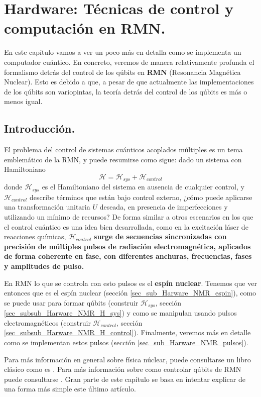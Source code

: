 \documentclass[a4paper,11pt]{book} %
\numberwithin{equation}{chapter}
\begin{document}
\chapter{Hardware: Técnicas de control y computación en RMN.}

En este capítulo vamos a ver un poco más en detalla como se implementa un computador cuántico. En concreto, veremos de manera relativamente profunda el formalismo detrás del control de los qúbits en \textbf{RMN} (Resonancia Magnética Nuclear). Esto es debido a que, a pesar de que actualmente las implementaciones de los qúbits son variopintas, la teoría detrás del control de los qúbits es más o menos igual. 

	\section{Introducción.}

El problema del control de sistemas cuánticos acoplados múltiples es un tema emblemático de la RMN, y puede resumirse como sigue: dado un sistema con Hamiltoniano
\begin{equation}
\mathcal{H} = \mathcal{H}_{sys} + \mathcal{H}_{control}
\end{equation}
donde $\mathcal{H}_{sys}$ es el Hamiltoniano del sistema en ausencia de cualquier control, y $\mathcal{H}_{control}$ describe términos que están bajo control externo, ¿cómo puede aplicarse una transformación unitaria $U$ deseada, en presencia de imperfecciones y utilizando un mínimo de recursos? De forma similar a otros escenarios en los que el control cuántico es una idea bien desarrollada, como en la excitación láser de reacciones químicas, $\mathcal{H}_{control}$ \textbf{surge de secuencias sincronizadas con precisión de múltiples pulsos de radiación electromagnética, aplicados de forma coherente en fase, con diferentes anchuras, frecuencias, fases y amplitudes de pulso.}

En RMN lo que se controla con esto pulsos es el \textbf{espín nuclear}. Tenemos que ver entonces que es el espín nuclear (sección \ref{sec_sub_Harware_NMR_espin}), como se puede usar para formar qúbits (construir $\mathcal{H}_{sys}$, sección \ref{sec_subsub_Harware_NMR_H_sys}) y como se  manipulan usando pulsos electromagnéticos (construir $\mathcal{H}_{control}$, sección \ref{sec_subsub_Harware_NMR_H_control}). Finalmente, veremos más en detalle como se implementan estos pulsos (sección \ref{sec_sub_Harware_NMR_pulsos}).

Para más información en general sobre física núclear, puede consultarse un libro clásico como es \cite{Krane:359790}. Para más información sobre como controlar qúbits de RMN puede consultarse \cite{NMR_hardware}. Gran parte de este capítulo se basa en intentar explicar de una forma más simple este último artículo.
\end{document}
